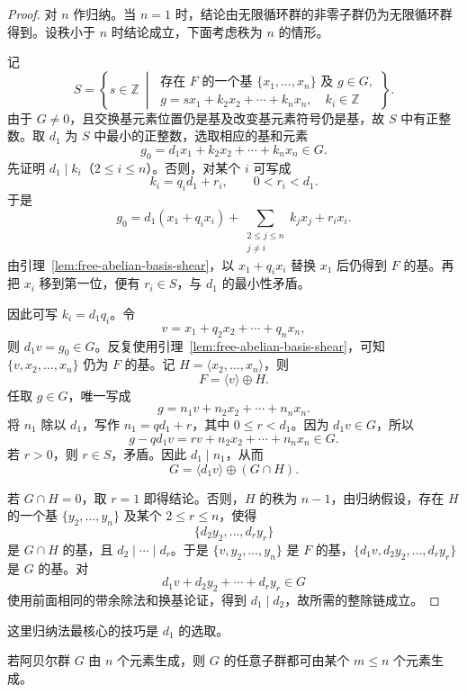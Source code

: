 \begin{proof}
对 $n$ 作归纳。当 $n=1$ 时，结论由无限循环群的非零子群仍为无限循环群得到。设秩小于 $n$ 时结论成立，下面考虑秩为 $n$ 的情形。

记
\[
  S=\left\{s\in\mathbb Z\ \middle|\
    \begin{array}{l}
      \text{存在 }F\text{ 的一个基 }\{x_1,\ldots,x_n\}\text{ 及 }g\in G,\\
      g=sx_1+k_2x_2+\cdots+k_nx_n,\quad k_i\in\mathbb Z
    \end{array}\right\}.
\]
由于 $G\ne0$，且交换基元素位置仍是基及改变基元素符号仍是基，故 $S$ 中有正整数。取 $d_1$ 为 $S$ 中最小的正整数，选取相应的基和元素
\[
  g_0=d_1x_1+k_2x_2+\cdots+k_nx_n\in G.
\]
先证明 $d_1\mid k_i$（$2\leq i\leq n$）。否则，对某个 $i$ 可写成
\[
  k_i=q_id_1+r_i,\qquad 0<r_i<d_1.
\]
于是
\[
  g_0=d_1(x_1+q_ix_i)
      +\sum_{\substack{2\leq j\leq n\\j\ne i}}k_jx_j+r_ix_i.
\]
由引理~\ref{lem:free-abelian-basis-shear}，以 $x_1+q_ix_i$ 替换 $x_1$ 后仍得到 $F$ 的基。再把 $x_i$ 移到第一位，便有 $r_i\in S$，与 $d_1$ 的最小性矛盾。

因此可写 $k_i=d_1q_i$。令
\[
  v=x_1+q_2x_2+\cdots+q_nx_n,
\]
则 $d_1v=g_0\in G$。反复使用引理~\ref{lem:free-abelian-basis-shear}，可知 $\{v,x_2,\ldots,x_n\}$ 仍为 $F$ 的基。记 $H=\langle x_2,\ldots,x_n\rangle$，则
\[
  F=\langle v\rangle\oplus H.
\]
任取 $g\in G$，唯一写成
\[
  g=n_1v+n_2x_2+\cdots+n_nx_n.
\]
将 $n_1$ 除以 $d_1$，写作 $n_1=qd_1+r$，其中 $0\leq r<d_1$。因为 $d_1v\in G$，所以
\[
  g-qd_1v=rv+n_2x_2+\cdots+n_nx_n\in G.
\]
若 $r>0$，则 $r\in S$，矛盾。因此 $d_1\mid n_1$，从而
\[
  G=\langle d_1v\rangle\oplus(G\cap H).
\]

若 $G\cap H=0$，取 $r=1$ 即得结论。否则，$H$ 的秩为 $n-1$，由归纳假设，存在 $H$ 的一个基 $\{y_2,\ldots,y_n\}$ 及某个 $2\leq r\leq n$，使得
\[
  \{d_2y_2,\ldots,d_ry_r\}
\]
是 $G\cap H$ 的基，且 $d_2\mid\cdots\mid d_r$。于是 $\{v,y_2,\ldots,y_n\}$ 是 $F$ 的基，$\{d_1v,d_2y_2,\ldots,d_ry_r\}$ 是 $G$ 的基。对
\[
  d_1v+d_2y_2+\cdots+d_ry_r\in G
\]
使用前面相同的带余除法和换基论证，得到 $d_1\mid d_2$，故所需的整除链成立。
\end{proof}

\begin{purplenote}
这里归纳法最核心的技巧是 $d_1$ 的选取。
\end{purplenote}

\begin{corollary}\label{cor:subgroups-finitely-generated-abelian}
若阿贝尔群 $G$ 由 $n$ 个元素生成，则 $G$ 的任意子群都可由某个 $m\leq n$ 个元素生成。
\end{corollary}

